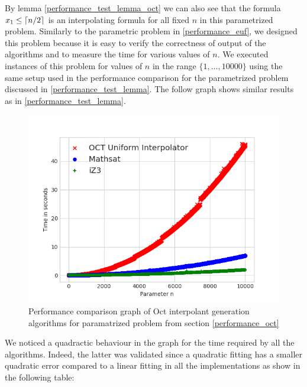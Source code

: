 By lemma \ref{performance_test_lemma_oct}
we can also see that the formula $x_1 \leq \lceil n/2\rceil$ is an 
interpolating formula for all fixed $n$ in this parametrized problem.
Similarly to the parametric problem in \ref{performance_euf}, 
we designed this problem because it is easy to verify the 
correctness of output of the algorithms and to measure 
the time for various values of $n$. 
We executed instances of this problem for values of $n$
in the range $\{1, \dots, 10000\}$ using the same setup 
used in the performance comparison for the parametrized 
problem discussed in \ref{performance_test_lemma}.
The follow graph shows similar results as 
in \ref{performance_test_lemma}.

\begin{figure}
  \centering
  \includegraphics[scale=0.9]{figures/octi_performance_graph}
  \caption{Performance comparison graph of Oct interpolant generation
  algorithms for paramatrized problem from section \ref{performance_oct}} 
  \label{performance_graph_euf}
\end{figure}

We noticed a quadractic behaviour in the graph for the time 
required by all the algorithms. Indeed, the latter was
validated since a quadratic fitting has a smaller quadratic
error compared to a linear fitting in all the implementations
as show in the following table:

